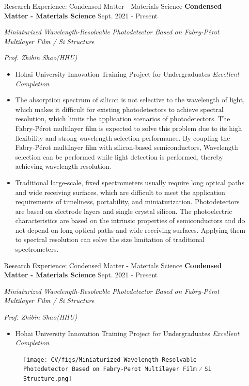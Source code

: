 \documentclass[9pt,aspectratio=169,hyperref=colorlinks]{beamer}
\begin{document}
\begin{frame}{Research Experience: Condensed Matter - Materials Science}
    \medskip \textbf{Condensed Matter - Materials Science} \hfill Sept. 2021 - Present

    \quad \textit{Miniaturized Wavelength-Resolvable Photodetector Based on Fabry-P\'{e}rot Multilayer Film / Si Structure}

    \hfill \textit{Prof. Zhibin Shao(HHU)}

    \begin{itemize}
        \item Hohai University Innovation Training Project for Undergraduates \textit{Excellent Completion}
        \item The absorption spectrum of silicon is not selective to the wavelength of light, which makes it difficult for existing photodetectors to achieve spectral resolution, which limits the application scenarios of photodetectors. The Fabry-P\'{e}rot multilayer film is expected to solve this problem due to its high flexibility and strong wavelength selection performance. By coupling the Fabry-P\'{e}rot multilayer film with silicon-based semiconductors, Wavelength selection can be performed while light detection is performed, thereby achieving wavelength resolution.
        \item Traditional large-scale, fixed spectrometers usually require long optical paths and wide receiving surfaces, which are difficult to meet the application requirements of timeliness, portability, and miniaturization. Photodetectors are based on electrode layers and single crystal silicon. The photoelectric characteristics are based on the intrinsic properties of semiconductors and do not depend on long optical paths and wide receiving surfaces. Applying them to spectral resolution can solve the size limitation of traditional spectrometers.
    \end{itemize}
\end{frame}

\begin{frame}{Research Experience: Condensed Matter - Materials Science}
    \medskip \textbf{Condensed Matter - Materials Science} \hfill Sept. 2021 - Present

    \quad \textit{Miniaturized Wavelength-Resolvable Photodetector Based on Fabry-P\'{e}rot Multilayer Film / Si Structure}

    \hfill \textit{Prof. Zhibin Shao(HHU)}

    \begin{itemize}
        \item Hohai University Innovation Training Project for Undergraduates \textit{Excellent Completion}
    \end{itemize}

    \begin{figure}
        \centering
        \texttt{[image: CV/figs/Miniaturized Wavelength-Resolvable Photodetector Based on Fabry-Perot Multilayer Film ⁄ Si Structure.png]}
    \end{figure}
\end{frame}
\end{document}
